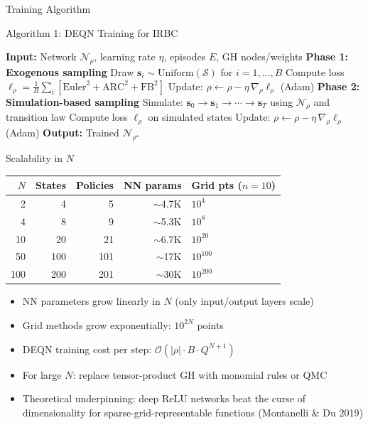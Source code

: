 \documentclass[aspectratio=169,11pt]{beamer}
\newcommand{\emphc}[1]{\textcolor{harvardcrimson}{#1}}
\begin{document}
\begin{frame}{Training Algorithm}
\begin{block}{Algorithm 1: DEQN Training for IRBC}
\begin{algorithmic}
\footnotesize
\STATE \textbf{Input:} Network $\mathcal{N}_\rho$, learning rate $\eta$, episodes $E$, GH nodes/weights
\STATE \textbf{Phase 1: Exogenous sampling}
    \STATE Draw $\bm{s}_i \sim \text{Uniform}(\mathcal{S})$ for $i = 1, \ldots, B$
    \STATE Compute loss $\ell_\rho = \frac{1}{B}\sum_i [\text{Euler}^2 + \text{ARC}^2 + \text{FB}^2]$
    \STATE Update: $\rho \leftarrow \rho - \eta\,\nabla_\rho \ell_\rho$ (Adam)
\ENDFOR
\STATE \textbf{Phase 2: Simulation-based sampling}
    \STATE Simulate: $\bm{s}_0 \to \bm{s}_1 \to \cdots \to \bm{s}_T$ using $\mathcal{N}_\rho$ and transition law
    \STATE Compute loss $\ell_\rho$ on simulated states
    \STATE Update: $\rho \leftarrow \rho - \eta\,\nabla_\rho \ell_\rho$ (Adam)
\ENDFOR
\STATE \textbf{Output:} Trained $\mathcal{N}_{\rho^\star}$
\end{algorithmic}
\end{block}
\end{frame}

\begin{frame}{Scalability in $N$}
\begin{center}
\begin{tabular}{rrrrl}
\toprule
$N$ & \textbf{States} & \textbf{Policies} & \textbf{NN params} & \textbf{Grid pts ($n\!=\!10$)} \\
\midrule
2 & 4 & 5 & $\sim$4.7K & $10^4$ \\
4 & 8 & 9 & $\sim$5.3K & $10^8$ \\
10 & 20 & 21 & $\sim$6.7K & $10^{20}$ \\
50 & 100 & 101 & $\sim$17K & $10^{100}$ \\
100 & 200 & 201 & $\sim$30K & $10^{200}$ \\
\bottomrule
\end{tabular}
\end{center}

\vspace{0.5em}
\begin{itemize}
    \item NN parameters grow \emphc{linearly} in $N$ (only input/output layers scale)
    \item Grid methods grow \emphc{exponentially}: $10^{2N}$ points
    \item DEQN training cost per step: $\mathcal{O}(|\rho| \cdot B \cdot Q^{N+1})$
    \item For large $N$: replace tensor-product GH with monomial rules or QMC
    \item Theoretical underpinning: \emphc{deep ReLU networks} beat the curse of dimensionality for sparse-grid-representable functions (Montanelli \& Du 2019)
\end{itemize}
\end{frame}
\end{document}
